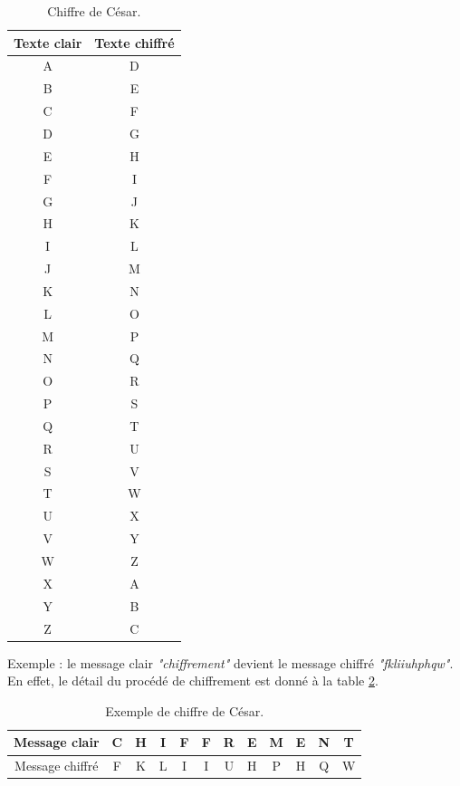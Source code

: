 \documentclass[oneside]{book}
\begin{document}
\begin{appendices}
\begin{table}[htbp]
	\centering
	\begin{tabular}{|c|c|}
    		\hline
   		  \textbf{Texte clair} & \textbf{Texte chiffré}  \\ \hline 
		  A & D \\ \hline
		  B & E \\ \hline	
		  C & F \\ \hline
		  D & G \\ \hline	
		  E & H \\ \hline
		  F & I \\ \hline	
		  G & J \\ \hline
		  H & K \\ \hline	
		  I & L \\ \hline
		  J & M \\ \hline	
		  K & N \\ \hline
		  L & O \\ \hline	
		  M & P \\ \hline
		  N & Q \\ \hline	
		  O & R \\ \hline
		  P & S \\ \hline	
		  Q & T \\ \hline
		  R & U \\ \hline	
		  S & V \\ \hline
		  T & W \\ \hline	
		  U & X \\ \hline
		  V & Y \\ \hline	
		  W & Z \\ \hline
		  X & A \\ \hline	
		  Y & B \\ \hline
		  Z & C \\ \hline	
	\end{tabular}
 	\caption{Chiffre de César.}
 	\label{tab:CESAR}
\end{table}

\hspace{-0.5cm}Exemple : le message clair \textit{"chiffrement"} devient le message chiffré \textit{"fkliiuhphqw"}. En effet, le détail du procédé de chiffrement est donné à la table \ref{tab:CesarEx}.

\begin{table}[htbp]
	\centering
	\begin{tabular}{|c|c|c|c|c|c|c|c|c|c|c|c|}
    		\hline
   		  Message clair & C & H & I & F & F & R & E & M & E & N & T \\ \hline 
   		  Message chiffré & F & K & L & I & I & U & H & P & H & Q & W  \\ \hline 
	\end{tabular}
 	\caption{Exemple de chiffre de César.}
 	\label{tab:CesarEx}
\end{table}


\end{appendices}
\end{document}
